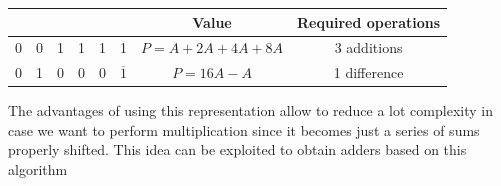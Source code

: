 \begin{center}
  \begin{tabular}{|c|c|c|c|c|c|c|c|}
    \hline
     & & & & & & Value & Required operations\\
    \hline
    0&  0&  1&  1&  1&  1&        $P=A+2A+4A+8A$&   3 additions\\
    0&  1&  0&  0&  0&  $\overline{1}$& $P=16A-A$&      1 difference\\
    \hline
  \end{tabular}
\end{center}

The advantages of using this representation allow to reduce a lot complexity in case we want to perform multiplication since it becomes just a series of sums properly shifted. This idea can be exploited to obtain adders based on this algorithm


